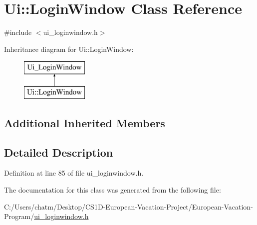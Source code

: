 \hypertarget{class_ui_1_1_login_window}{}\section{Ui\+::Login\+Window Class Reference}
\label{class_ui_1_1_login_window}


{\ttfamily \#include $<$ui\+\_\+loginwindow.\+h$>$}

Inheritance diagram for Ui\+::Login\+Window\+:\begin{figure}[H]
\begin{center}
\leavevmode
\includegraphics[height=2.000000cm]{class_ui_1_1_login_window}
\end{center}
\end{figure}
\subsection*{Additional Inherited Members}


\subsection{Detailed Description}


Definition at line 85 of file ui\+\_\+loginwindow.\+h.



The documentation for this class was generated from the following file\+:\begin{DoxyCompactItemize}
\item 
C\+:/\+Users/chatm/\+Desktop/\+C\+S1\+D-\/\+European-\/\+Vacation-\/\+Project/\+European-\/\+Vacation-\/\+Program/\mbox{\hyperlink{ui__loginwindow_8h}{ui\+\_\+loginwindow.\+h}}\end{DoxyCompactItemize}
